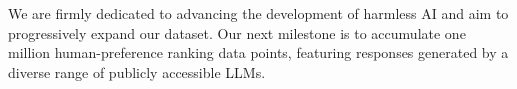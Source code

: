\documentclass{article}
\begin{document}
We are firmly dedicated to advancing the development of harmless AI and aim to progressively expand our dataset. Our next milestone is to accumulate one million human-preference ranking data points, featuring responses generated by a diverse range of publicly accessible LLMs.

% 

\clearpage



\clearpage

\end{document}
